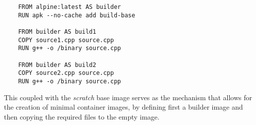 \lstset{language=Dockerfile,caption=Sample Multi-stage Dockerfile,label=lst:ex-multi-stage-dockerifle}
\begin{lstlisting}
    FROM alpine:latest AS builder
    RUN apk --no-cache add build-base
    
    FROM builder AS build1
    COPY source1.cpp source.cpp
    RUN g++ -o /binary source.cpp
    
    FROM builder AS build2
    COPY source2.cpp source.cpp
    RUN g++ -o /binary source.cpp   
\end{lstlisting}

This coupled with the \textit{scratch} base image serves as the mechanism that allows for the creation of minimal container images, by defining first a 
builder image and then copying the required files to the empty image.
